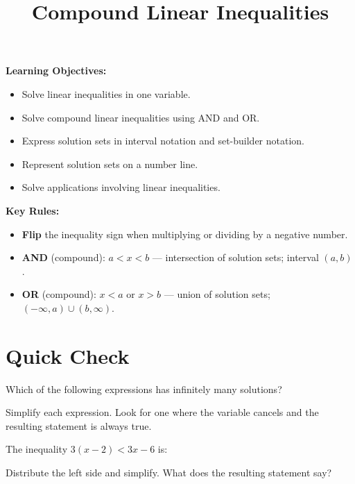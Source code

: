 \documentclass{ximera}
\title{Compound Linear Inequalities}
\begin{document}
\begin{abstract}
\end{abstract}
\maketitle

\textbf{Learning Objectives:}
\begin{itemize}
  \item Solve linear inequalities in one variable.
  \item Solve compound linear inequalities using AND and OR.
  \item Express solution sets in interval notation and set-builder notation.
  \item Represent solution sets on a number line.
  \item Solve applications involving linear inequalities.
\end{itemize}
\medskip

\noindent\textbf{Key Rules:}
\begin{itemize}
  \item \textbf{Flip} the inequality sign when multiplying or dividing by a negative number.
  \item \textbf{AND} (compound): $a < x < b$ — intersection of solution sets; interval $(a,b)$.
  \item \textbf{OR} (compound): $x < a$ or $x > b$ — union of solution sets; $(-\infty,a)\cup(b,\infty)$.
\end{itemize}

\bigskip
\section*{Quick Check}

\begin{problem}
Which of the following expressions has infinitely many solutions?
\begin{hint}
Simplify each expression. Look for one where the variable cancels and the resulting statement is always true.
\end{hint}
\begin{multipleChoice}
\end{multipleChoice}
\end{problem}

\begin{problem}
The inequality $3(x-2) < 3x - 6$ is:
\begin{hint}
Distribute the left side and simplify. What does the resulting statement say?
\end{hint}
\begin{multipleChoice}
\end{multipleChoice}
\end{problem}
\end{document}
